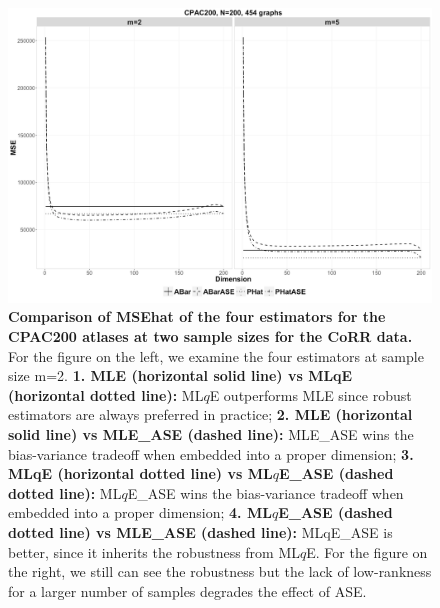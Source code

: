 \documentclass[simplex.tex]{subfiles}
\begin{document}
\begin{figure}[h!]
\begin{cframed}
\centering
\includegraphics[width=\textwidth]{../../figs/robDim.png}
\caption{
{\bf Comparison of MSEhat of the four estimators for the CPAC200 atlases at two sample sizes for the CoRR data.}  
For the figure on the left, we examine the four estimators at sample size m=2. 
{\bf 1. MLE (horizontal solid line) vs MLqE (horizontal dotted
line):} 
ML$q$E outperforms MLE since
robust estimators are always preferred in practice;
{\bf 2. MLE (horizontal solid line) vs MLE\_ASE (dashed line):} MLE\_ASE wins the bias-variance
tradeoff when embedded into a proper dimension; 
{\bf 3. MLqE (horizontal
dotted line) vs ML$q$E\_ASE (dashed dotted line):}
ML$q$E\_ASE wins the
bias-variance tradeoff when embedded into a proper dimension; 
{\bf 4.  ML$q$E\_ASE (dashed dotted line) vs MLE\_ASE (dashed
line):}
MLqE\_ASE is better, since it inherits the robustness from 
ML$q$E. For the figure on the right, we still can see the
robustness but the lack of low-rankness
for a larger number of samples degrades the effect of ASE.
}
\label{fig:robDim}
\end{cframed}
\end{figure}
\end{document}
